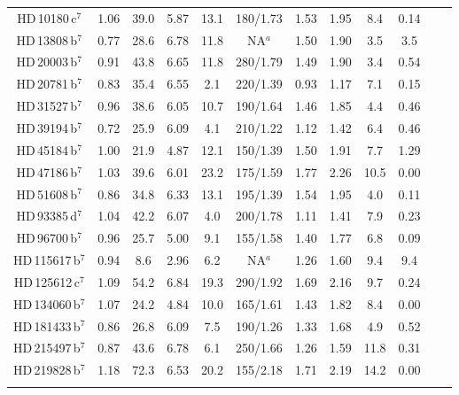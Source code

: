 \documentclass[traditabstract]{aa}
\begin{document}
\begin{table*}
\begin{center}
\begin{tabular}{cccccccccccc}
HD\,10180\,c$^{7}$  & 1.06 & 39.0  & 5.87 & 13.1 & 180/1.73 & 1.53 & 1.95 &  8.4 &  0.14   \\ \noalign {\smallskip}
HD\,13808\,b$^{7}$ & 0.77 & 28.6  & 6.78 & 11.8 &  NA$^{a}$ & 1.50 & 1.90 &  3.5 &  3.5 \\ \noalign {\smallskip}
HD\,20003\,b$^{7}$ & 0.91 & 43.8  & 6.65 & 11.8 &  280/1.79 & 1.49 & 1.90 & 3.4 &  0.54 \\ \noalign {\smallskip}
HD\,20781\,b$^{7}$ & 0.83 & 35.4  & 6.55 & 2.1 &  220/1.39 & 0.93 & 1.17 &  7.1 &  0.15  \\ \noalign {\smallskip}
HD\,31527\,b$^{7}$ & 0.96 & 38.6  & 6.05 & 10.7 & 190/1.64  & 1.46 & 1.85 & 4.4 &  0.46  \\ \noalign {\smallskip}
HD\,39194\,b$^{7}$ & 0.72 & 25.9 & 6.09 & 4.1 &  210/1.22 & 1.12 & 1.42 &  6.4 &  0.46 \\ \noalign {\smallskip}
HD\,45184\,b$^{7}$ & 1.00 & 21.9 & 4.87 & 12.1 & 150/1.39 & 1.50 & 1.91 & 7.7 &  1.29 \\ \noalign {\smallskip}
HD\,47186\,b$^{7}$ & 1.03 & 39.6  & 6.01 & 23.2 & 175/1.59 & 1.77 & 2.26 & 10.5 &  0.00  \\ \noalign {\smallskip}
HD\,51608\,b$^{7}$ & 0.86 & 34.8  & 6.33 & 13.1 & 195/1.39 & 1.54 & 1.95 &  4.0 &  0.11 \\ \noalign {\smallskip}
HD\,93385\,d$^{7}$ & 1.04 & 42.2 & 6.07 & 4.0 &  200/1.78 & 1.11 & 1.41 &  7.9 &  0.23  \\ \noalign {\smallskip}
HD\,96700\,b$^{7}$ & 0.96 & 25.7 & 5.00 & 9.1 & 155/1.58 & 1.40  & 1.77 & 6.8 &  0.09 \\ \noalign {\smallskip}
HD\,115617\,b$^{7}$& 0.94 & 8.6 & 2.96 & 6.2 &  NA$^{a}$ & 1.26  & 1.60 & 9.4 &  9.4  \\ \noalign {\smallskip}
HD\,125612\,c$^{7}$ & 1.09 & 54.2  & 6.84 & 19.3 &  290/1.92 & 1.69 & 2.16 & 9.7 &  0.24 \\ \noalign {\smallskip}
HD\,134060\,b$^{7}$ & 1.07 & 24.2 & 4.84 & 10.0 &  165/1.61 & 1.43 & 1.82 & 8.4 &  0.00  \\ \noalign {\smallskip}
HD\,181433\,b$^{7}$ & 0.86 & 26.8 & 6.09 & 7.5 & 190/1.26 & 1.33  & 1.68 & 4.9 &  0.52  \\ \noalign {\smallskip}
HD\,215497\,b$^{7}$ & 0.87 & 43.6 & 6.78 & 6.1 &  250/1.66 & 1.26 & 1.59 & 11.8 &  0.31 \\ \noalign {\smallskip}
HD\,219828\,b$^{7}$ & 1.18 & 72.3  & 6.53 & 20.2 &  155/2.18 & 1.71 & 2.19 & 14.2 &  0.00  \\ \noalign {\smallskip}

\end{tabular}
\end{center}
\end{table*}
\end{document}
